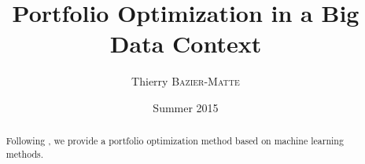 \documentclass[11pt]{article}
\title{Portfolio Optimization in a Big Data Context}
\author{Thierry \textsc{Bazier-Matte}}
\date{Summer 2015}
\begin{document}
\maketitle

\begin{abstract}
  Following \cite{rudin2015}, we provide a portfolio optimization method based on machine
  learning methods.
\end{abstract}






\end{document}
